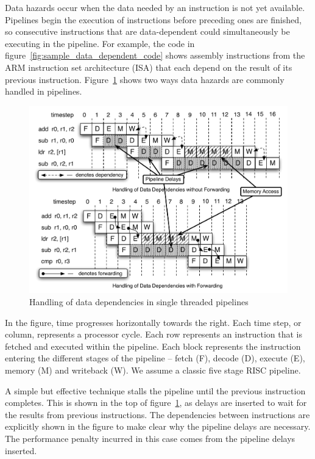 Data hazards occur when the data needed by an instruction is not yet available.
Pipelines begin the execution of instructions before preceding ones are finished, so consecutive instructions that are data-dependent could simultaneously be executing in the pipeline.
For example, the code in figure~\ref{fig:sample_data_dependent_code} shows assembly instructions from the ARM instruction set architecture (ISA) that each depend on the result of its previous instruction.
Figure~\ref{fig:data_depend_execution_non_interleaved} shows two ways data hazards are commonly handled in pipelines. 

\begin{figure}
\vspace{-20pt} 
\begin{center}
\includegraphics[scale=.6]{figs/data_depend_execution_non_interleaved}
\end{center}
\vspace{-3mm}
\caption{Handling of data dependencies in single threaded pipelines}
\label{fig:data_depend_execution_non_interleaved}
\end{figure}

In the figure, time progresses horizontally towards the right.
Each time step, or column, represents a processor cycle.
Each row represents an instruction that is fetched and executed within the pipeline.
Each block represents the instruction entering the different stages of the pipeline -- fetch (F), decode (D), execute (E), memory (M) and writeback (W).   
We assume a classic five stage RISC pipeline.

A simple but effective technique stalls the pipeline until the previous instruction completes.
This is shown in the top of figure~\ref{fig:data_depend_execution_non_interleaved}, as delays are inserted to wait for the results from previous instructions.
The dependencies between instructions are explicitly shown in the figure to make clear why the pipeline delays are necessary.
The performance penalty incurred in this case comes from the pipeline delays inserted.

